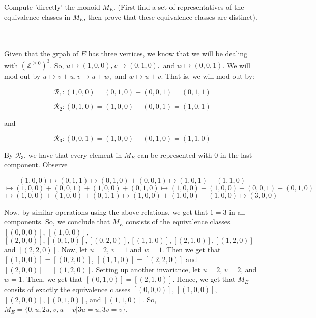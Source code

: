 Compute 'directly' the monoid $M_E$. (First find a set of representatives of the equivalence classes in
$M_E$, then prove that these equivalence classes are distinct).\\\\

\begin{solution}\renewcommand{\qedsymbol}{}\ \\
    Given that the grpah of $E$ has three vertices, we know that we will be dealing with
    $(\mathbb{Z}^{\geq0})^3$. So, $u\mapsto(1,0,0), v\mapsto(0,1,0),$ and $w\mapsto(0,0,1)$. We will mod
    out by $u\mapsto v+u, v\mapsto u+w,$ and $w\mapsto u+v$. That is, we will mod out by:

    $$\mathcal{R}_1:(1,0,0)=(0,1,0)+(0,0,1)=(0,1,1)$$

    $$\mathcal{R}_2:(0,1,0)=(1,0,0)+(0,0,1)=(1,0,1)$$

    and

    $$\mathcal{R}_3:(0,0,1)=(1,0,0)+(0,1,0)=(1,1,0)$$

    By $\mathcal{R}_3$, we have that every element in $M_E$ can be represented with $0$ in the last
    component. Observe

    $$(1,0,0)\mapsto(0,1,1)\mapsto(0,1,0)+(0,0,1)\mapsto(1,0,1)+(1,1,0)$$
    $$\mapsto(1,0,0)+(0,0,1)+(1,0,0)+(0,1,0)\mapsto(1,0,0)+(1,0,0)+(0,0,1)+(0,1,0)$$
    $$\mapsto(1,0,0)+(1,0,0)+(0,1,1)\mapsto(1,0,0)+(1,0,0)+(1,0,0)\mapsto(3,0,0)$$

    Now, by similar operations using the above relations, we get that $1=3$ in all components. So, we
    conclude that $M_E$ consists of the equivalence classes $[(0,0,0)]$, $[(1,0,0)],$
    $[(2,0,0)], [(0,1,0)], [(0,2,0)], [(1,1,0)], [(2,1,0)], [(1,2,0)]$ and $[(2,2,0)]$. Now, let $u=2$,
    $v=1$ and $w=1$. Then we get that $[(1,0,0)]=[(0,2,0)]$, $[(1,1,0)]=[(2,2,0)]$ and
    $[(2,0,0)]=[(1,2,0)]$. Setting up another invariance, let $u=2$, $v=2$, and $w=1$. Then, we get that
    $[(0,1,0)]=[(2,1,0)]$. Hence, we get that $M_E$ consits of exactly the equivalence classes
    $[(0,0,0)]$, $[(1,0,0)],$ $[(2,0,0)], [(0,1,0)]$, and $[(1,1,0)]$. So,
    $M_E=\{0,u,2u,v,u+v|3u=u,3v=v\}$.

\end{solution}